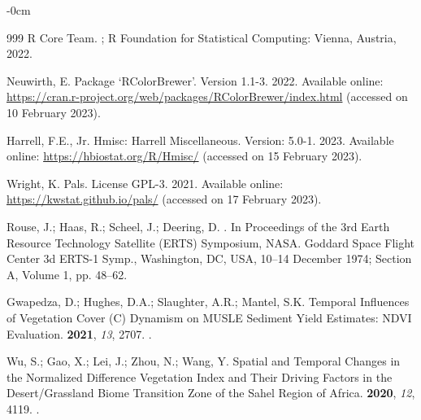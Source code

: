 \documentclass[jimaging,article,accept,pdftex,moreauthors]{Definitions/mdpi}
\begin{document}
\begin{adjustwidth}{-\extralength}{0cm}
\begin{thebibliography}{999}
{R Core Team}.
;
\newblock R Foundation for Statistical Computing: Vienna, Austria,  2022.

Neuwirth, E.
\newblock Package `RColorBrewer'. Version 1.1-3. 2022.
\newblock  Available online: \url{https://cran.r-project.org/web/packages/RColorBrewer/index.html} (accessed on 10 February 2023). %

{Harrell}, F.E., Jr.
\newblock Hmisc: Harrell Miscellaneous. Version: 5.0-1. 2023.
\newblock Available online: \url{https://hbiostat.org/R/Hmisc/}  (accessed on 15 February 2023). %

Wright, K.
\newblock Pals. License GPL-3. 2021.
\newblock Available online: \url{https://kwstat.github.io/pals/}  (accessed on 17 February 2023). %

Rouse, J.; Haas, R.; Scheel, J.; Deering, D.
.
\newblock In Proceedings of the 3rd Earth Resource Technology
  Satellite (ERTS) Symposium, NASA. Goddard Space Flight Center 3d ERTS-1
  Symp., Washington, DC, USA, 10--14 December 1974; Section A, Volume 1,  pp. 48--62.

Gwapedza, D.; Hughes, D.A.; Slaughter, A.R.; Mantel, S.K.
\newblock Temporal Influences of Vegetation Cover (C) Dynamism on MUSLE
  Sediment Yield Estimates: NDVI Evaluation.
 {\bf 2021}, {\em 13}, 2707.
.

Wu, S.; Gao, X.; Lei, J.; Zhou, N.; Wang, Y.
\newblock Spatial and Temporal Changes in the Normalized Difference Vegetation
  Index and Their Driving Factors in the Desert/Grassland Biome Transition Zone
  of the Sahel Region of Africa.
 {\bf 2020}, {\em 12}, 4119.
.


\end{thebibliography}
\end{adjustwidth}
\end{document}
